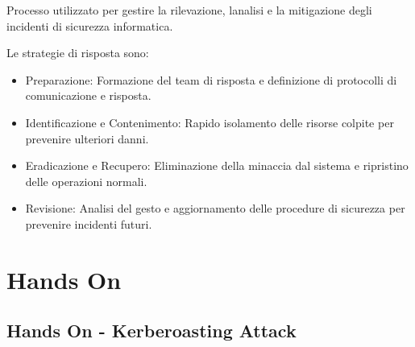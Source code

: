 \documentclass[
]{article}
\providecommand{\tightlist}{%
  \setlength{\itemsep}{0pt}\setlength{\parskip}{0pt}}
\begin{document}
{Processo utilizzato per gestire la rilevazione,
l\textquotesingle analisi e la mitigazione degli incidenti di sicurezza
informatica.}

{}

{Le strategie di risposta sono:}

\begin{itemize}
\tightlist
\item
  {Preparazione: Formazione del team di risposta e definizione di
  protocolli di comunicazione e risposta. }
\end{itemize}

{}

\begin{itemize}
\tightlist
\item
  {Identificazione e Contenimento: Rapido isolamento delle risorse
  colpite per prevenire ulteriori danni. }
\end{itemize}

{}

\begin{itemize}
\tightlist
\item
  {Eradicazione e Recupero: Eliminazione della minaccia dal sistema e
  ripristino delle operazioni normali. }
\end{itemize}

{}

\begin{itemize}
\tightlist
\item
  {Revisione: Analisi del gesto e aggiornamento delle procedure di
  sicurezza per prevenire incidenti futuri.}
\end{itemize}

{}

{}

\section{\texorpdfstring{{Hands On}}{Hands On}}\label{h.pragrfqjusjt}

\subsection{\texorpdfstring{{Hands On - Kerberoasting
Attack}}{Hands On - Kerberoasting Attack}}\label{h.jowh8gke615q}
\end{document}
